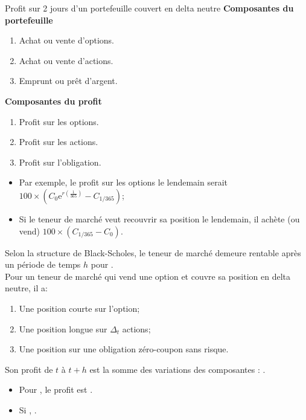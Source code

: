 \documentclass[10pt, french]{article}
\begin{document}
\begin{multicols*}{2}
\begin{conceptgen}{Profit sur 2 jours d'un portefeuille couvert en delta neutre}
\textbf{Composantes du portefeuille}
\begin{enumerate}
	\item	Achat ou vente d'options.
	\item	Achat ou vente d'actions.
	\item	Emprunt ou prêt d'argent.
\end{enumerate}
\tcbline
\textbf{Composantes du profit}
\begin{enumerate}
	\item	Profit sur les options.
	\item	Profit sur les actions.
	\item	Profit sur l'obligation.
\end{enumerate}
\tcbline
\begin{itemize}[leftmargin = *]
	\item	Par exemple, le profit sur les options le lendemain serait $100 \times (C_{0}\textrm{e}^{r(\frac{1}{365})} - C_{1/365})$;
	\item	Si le teneur de marché veut recouvrir sa position le lendemain, il achète (ou vend) $100 \times (C_{1/365} - C_{0})$.
\end{itemize}
\end{conceptgen}

Selon la structure de Black-Scholes, le teneur de marché demeure rentable après un période de temps $h$ pour .\\

Pour un teneur de marché qui vend une option et couvre sa position en delta neutre, il a:
\begin{enumerate}
	\item	Une position courte sur l'option;
	\item	Une position longue sur $\Delta_{t}$ actions;
	\item	Une position sur une obligation zéro-coupon sans risque.
\end{enumerate}

Son profit de $t$ à $t + h$ est la somme des variations des composantes : .
\begin{itemize}
	\item	Pour , le profit est .
	\item	Si , .
\end{itemize}


\end{multicols*}
\end{document}
